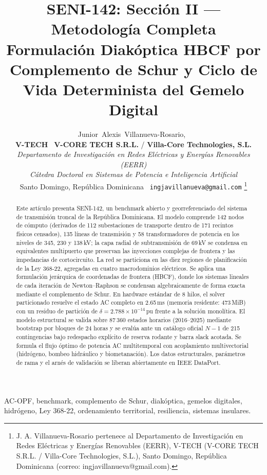\documentclass[11pt, journal, onecolumn]{IEEEtran}
\title{SENI-142: Sección II — Metodología Completa\\Formulación Diakóptica HBCF por Complemento de Schur y Ciclo de Vida Determinista del Gemelo Digital}
\author{Junior~Alexis~Villanueva-Rosario,~\IEEEmembership{Ms.C., Ph.D.(c)}\\[0.3em]
{\normalsize\textnormal{\textbf{V-TECH} \textbar\ \textbf{V-CORE TECH S.R.L.} / \textbf{Villa-Core Technologies, S.L.}}}\\[0.15em]
{\footnotesize\textnormal{\textit{Departamento de Investigación en Redes Eléctricas y Energías Renovables (EERR)}}}\\[0.15em]
{\footnotesize\textnormal{\textit{Cátedra Doctoral en Sistemas de Potencia e Inteligencia Artificial}}}\\[0.15em]
{\footnotesize\textnormal{Santo Domingo, República Dominicana \textbar\ \texttt{ingjavillanueva@gmail.com}}}%
\thanks{J. A. Villanueva-Rosario pertenece al Departamento de Investigación en Redes Eléctricas y Energías Renovables (EERR), V-TECH (V-CORE TECH S.R.L. / Villa-Core Technologies, S.L.), Santo Domingo, República Dominicana (correo: ingjavillanueva@gmail.com).}}
\begin{document}
\maketitle

\begin{abstract}
Este artículo presenta SENI-142, un benchmark abierto y georreferenciado del sistema de transmisión troncal de la República Dominicana. El modelo comprende 142 nodos de cómputo (derivados de 112 subestaciones de transporte dentro de 171 recintos físicos censados), 135 líneas de transmisión y 58 transformadores de potencia en los niveles de 345, 230 y 138\,kV; la capa radial de subtransmisión de 69\,kV se condensa en equivalentes multipuerto que preservan las inyecciones complejas de frontera y las impedancias de cortocircuito. La red se particiona en las diez regiones de planificación de la Ley 368-22, agregadas en cuatro macrodominios eléctricos. Se aplica una formulación jerárquica de coordenadas de frontera (HBCF), donde los sistemas lineales de cada iteración de Newton--Raphson se condensan algebraicamente de forma exacta mediante el complemento de Schur. En hardware estándar de 8 hilos, el solver particionado resuelve el estado AC completo en 2.65\,ms (memoria residente: 473\,MiB) con un residuo de partición de $\delta = 2.788 \times 10^{-14}$\,pu frente a la solución monolítica. El modelo estructural se valida sobre 87\,360 estados horarios (2016--2025) mediante bootstrap por bloques de 24 horas y se evalúa ante un catálogo oficial $N-1$ de 215 contingencias bajo redespacho explícito de reserva rodante y barra slack acotada. Se formula el flujo óptimo de potencia AC multitemporal con acoplamiento multivectorial (hidrógeno, bombeo hidráulico y biometanación). Los datos estructurales, parámetros de rama y el arnés de validación se liberan abiertamente en IEEE DataPort.
\end{abstract}

\begin{IEEEkeywords}
AC-OPF, benchmark, complemento de Schur, diakóptica, gemelos digitales, hidrógeno, Ley 368-22, ordenamiento territorial, resiliencia, sistemas insulares.
\end{IEEEkeywords}

\vspace{10pt}





\end{document}
